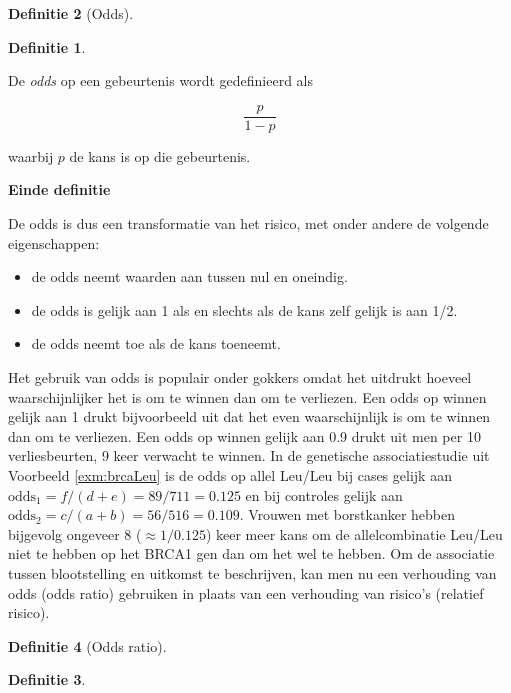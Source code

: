 \documentclass[
  12pt,dutch,coursenotes]{book}
\theoremstyle{definition}
\newtheorem{definition}{Definitie}[chapter]
\theoremstyle{definition}
\theoremstyle{definition}
\theoremstyle{remark}
\begin{document}
\begin{definition}[Odds]
\begin{definition}

\protect\hypertarget{def:unnamed-chunk-112}{}{\label{def:unnamed-chunk-112} \iffalse (Odds) \fi{} }

\end{definition}
\end{definition}

De \emph{odds} op een gebeurtenis wordt gedefinieerd als

\begin{equation*}
\frac{p}{1-p}
\end{equation*}

waarbij \(p\) de kans is op die gebeurtenis.

\textbf{Einde definitie}

De odds is dus een transformatie van het risico, met onder andere de
volgende eigenschappen:

\begin{itemize}
\item
  de odds neemt waarden aan tussen nul en oneindig.
\item
  de odds is gelijk aan 1 als en slechts als de kans zelf gelijk is aan
  1/2.
\item
  de odds neemt toe als de kans toeneemt.
\end{itemize}

Het gebruik van odds is populair onder gokkers omdat het uitdrukt hoeveel
waarschijnlijker het is om te winnen dan om te verliezen. Een odds op winnen
gelijk aan 1 drukt bijvoorbeeld uit dat het even waarschijnlijk is om te
winnen dan om te verliezen. Een odds op winnen gelijk aan 0.9 drukt uit men
per 10 verliesbeurten, 9 keer verwacht te winnen. In de genetische associatiestudie uit Voorbeeld \ref{exm:brcaLeu}
is de odds op allel Leu/Leu bij cases gelijk aan
\(\mbox{odds}_1=f/(d+e)=89/711=0.125\) en bij controles gelijk aan \(\mbox{odds}_2=c/(a+b)=56/516=0.109\). Vrouwen met borstkanker hebben bijgevolg ongeveer 8 (\(\approx 1/0.125\)) keer meer kans om de allelcombinatie Leu/Leu niet te hebben op het BRCA1 gen dan om het wel te hebben.
Om de associatie tussen blootstelling
en uitkomst te beschrijven, kan men nu een verhouding van odds (odds ratio)
gebruiken in plaats van een verhouding van risico's (relatief risico).

\begin{definition}[Odds ratio]
\begin{definition}

\protect\hypertarget{def:unnamed-chunk-113}{}{\label{def:unnamed-chunk-113} \iffalse (Odds ratio) \fi{} }

\end{definition}
\end{definition}
\end{document}
